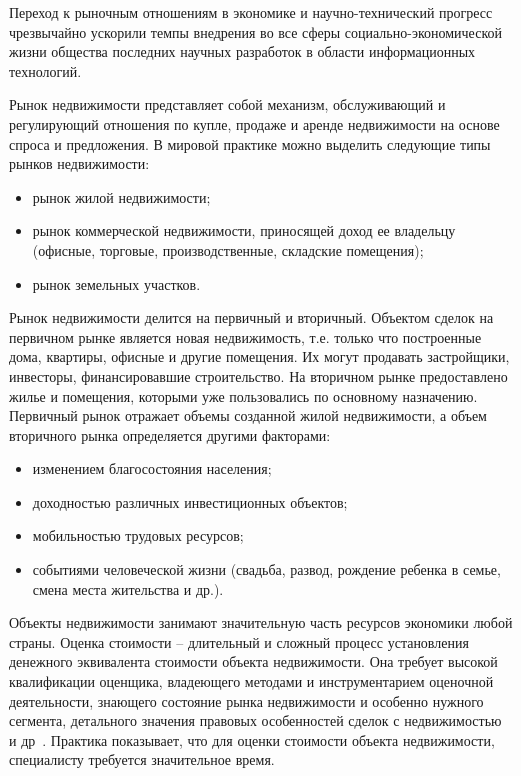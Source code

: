
\label{sec:introduction}



Переход к рыночным отношениям в экономике и научно-технический прогресс чрезвычайно ускорили темпы внедрения во все
сферы социально-экономической жизни общества последних научных разработок в области информационных технологий.

Рынок недвижимости представляет собой механизм, обслуживающий и регулирующий отношения по купле,
продаже и аренде недвижимости на основе спроса и предложения.
В мировой практике можно выделить следующие типы рынков недвижимости:
\begin{itemize}
	\item рынок жилой недвижимости;
	\item рынок коммерческой недвижимости, приносящей доход ее владельцу (офисные, торговые, производственные,
  складские помещения);
  \item рынок земельных участков.
\end{itemize}

Рынок недвижимости делится на первичный и вторичный. Объектом сделок на первичном рынке является
новая недвижимость, т.е. только что построенные дома, квартиры, офисные и другие помещения. Их могут продавать
застройщики, инвесторы, финансировавшие строительство. На вторичном рынке предоставлено жилье и помещения,
которыми уже пользовались по основному назначению. Первичный рынок отражает объемы созданной жилой недвижимости, а
объем вторичного рынка определяется другими факторами:
\begin{itemize}
  \item изменением благосостояния населения;
  \item доходностью различных инвестиционных объектов;
  \item мобильностью трудовых ресурсов;
  \item событиями человеческой жизни (свадьба, развод, рождение ребенка в семье, смена места жительства и др.).
\end{itemize}

Объекты недвижимости занимают значительную часть ресурсов экономики любой страны.
Оценка стоимости – длительный и сложный процесс установления денежного эквивалента стоимости объекта недвижимости.
Она требует высокой квалификации оценщика, владеющего методами и инструментарием оценочной деятельности, знающего состояние
рынка недвижимости и особенно нужного сегмента, детального значения правовых особенностей сделок с недвижимостью и др~\cite{audit}.
Практика показывает, что для оценки стоимости объекта недвижимости, специалисту требуется значительное время.

